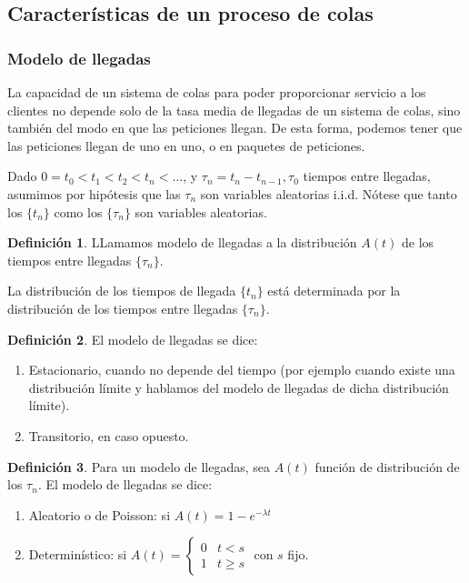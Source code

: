 \documentclass[a4paper,10pt]{scrartcl}
\theoremstyle{definition}
\newtheorem*{mydef}{Definición}
\numberwithin{equation}{section}
\begin{document}
\subsection{Características de un proceso de colas}
\subsubsection{Modelo de llegadas}
La capacidad de un sistema de colas para poder proporcionar servicio a los clientes no depende solo de la tasa media
de llegadas de un sistema de colas, sino también del modo en que las peticiones llegan. De esta forma, podemos
tener que las peticiones llegan de uno en uno, o en paquetes de peticiones.

Dado $0=t_0 < t_1 < t_2 < t_n < \ldots$, y $\tau_n = t_n - t_{n-1}, \tau_0$ tiempos entre llegadas, asumimos por hipótesis
que las $\tau_n$ son variables aleatorias i.i.d. Nótese que tanto los $\{t_n\}$ como los $\{\tau_n\}$ son
variables aleatorias.

\begin{mydef}
LLamamos modelo de llegadas a la distribución $A(t)$ de los tiempos entre llegadas $\{\tau_n\}$.
\end{mydef}
 
 La distribución de los tiempos de llegada $\{t_n\}$ está determinada por la distribución de los tiempos entre
 llegadas $\{\tau_n\}$. 
 
\begin{mydef}
El modelo de llegadas se dice:
 
 \begin{enumerate}
   \item Estacionario, cuando no depende del tiempo (por ejemplo cuando existe una distribución límite y hablamos
   del modelo de llegadas de dicha distribución límite).
   \item Transitorio, en caso opuesto.
 \end{enumerate}
\end{mydef}

 
\begin{mydef}
 Para un modelo de llegadas, sea $A(t)$ función de distribución de los $\tau_n$. 
 El modelo de llegadas se dice:

  \begin{enumerate}
  \item Aleatorio o de Poisson: si $A(t) = 1 - e^{-\lambda t}$
  \item Determinístico: si $A(t) = \left\{\begin{array}{ll}
					0 & t<s \\
					1 & t\ge s
					\end{array}\right.$ con $s$ fijo.
  
  \end{enumerate}
\end{mydef}
\end{document}
